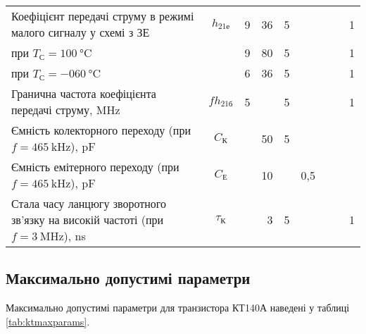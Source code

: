 \documentclass[ukrainian,utf8,nocolumnsxix,nocolumnxxxi,nocolumnxxxii]{eskdtext}
\begin{document}
\begin{center}
\begin{longtable}{|x{0.22\textwidth}|c|r|r|r|r|r|r|r|}
						\hline
						Коефіцієнт передачі струму в режимі малого сигналу у схемі з ЗЕ & $h_{21\text{е}}$ & 9 & 36 & 5 & & & & 1 \\
						при $T_{\text{С}} = \SI{+100}{\celsius}$ & & 9 & 80 & 5 & & & & 1 \\
						при $T_{\text{С}} = \SI{-060}{\celsius}$ & & 6 & 36 & 5 & & & & 1 \\
						\hline
						Гранична частота коефіцієнта передачі струму, \si{\mega\hertz} & $fh_{21\text{б}}$ & 5 &  & 5 & & & & 1 \\
						\hline
						Ємність колекторного переходу (при $f = \SI{465}{\kilo\hertz}$), \si{\pico\farad} & $C_{\text{К}}$& & 50 & 5 & & & & \\
						\hline
						Ємність емітерного переходу (при $f = \SI{465}{\kilo\hertz}$), \si{\pico\farad} & $C_{\text{Е}}$& & 10 & & 0{,}5& & & \\
						\hline
						Стала часу ланцюгу зворотного зв'язку на високій частоті (при $f = \SI{3}{\mega\hertz}$), \si{\nano\second} & $\tau_{\text{К}}$& & 3 & 5 & & & & 1\\
					\hline
				\end{longtable}
				\end{center}
			
		\subsection{Максимально допустимі параметри}
			Максимально допустимі параметри для транзистора КТ140А наведені у таблиці \ref{tab:ktmaxparams}.
			
\end{document}
